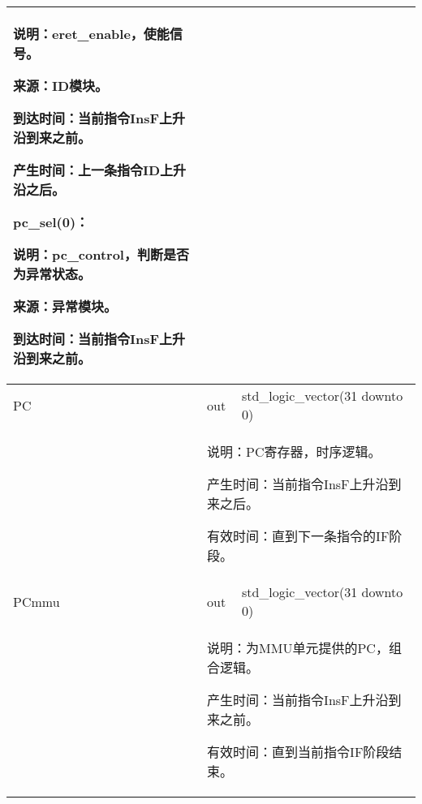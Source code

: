 \begin{tabularx}{\textwidth}{lll}
{                    说明：eret\_enable，使能信号。

                    来源：ID模块。

                    到达时间：当前指令InsF上升沿到来之前。

                    产生时间：上一条指令ID上升沿之后。
                    
                pc\_sel(0)：

                    说明：pc\_control，判断是否为异常状态。

                    来源：异常模块。

                    到达时间：当前指令InsF上升沿到来之前。
            } \\
            \midrule
            PC              & out       & std\_logic\_vector(31 downto 0) \\
            \cmidrule(l){2-3}
            &
            \multicolumn{2}{X}{
                说明：PC寄存器，时序逻辑。

                产生时间：当前指令InsF上升沿到来之后。

                有效时间：直到下一条指令的IF阶段。
            } \\
            \midrule
            PCmmu           & out       & std\_logic\_vector(31 downto 0) \\
            \cmidrule(l){2-3}
            &
            \multicolumn{2}{X}{
                说明：为MMU单元提供的PC，组合逻辑。

                产生时间：当前指令InsF上升沿到来之前。

                有效时间：直到当前指令IF阶段结束。
            } \\
            \bottomrule
            \end{tabularx}
